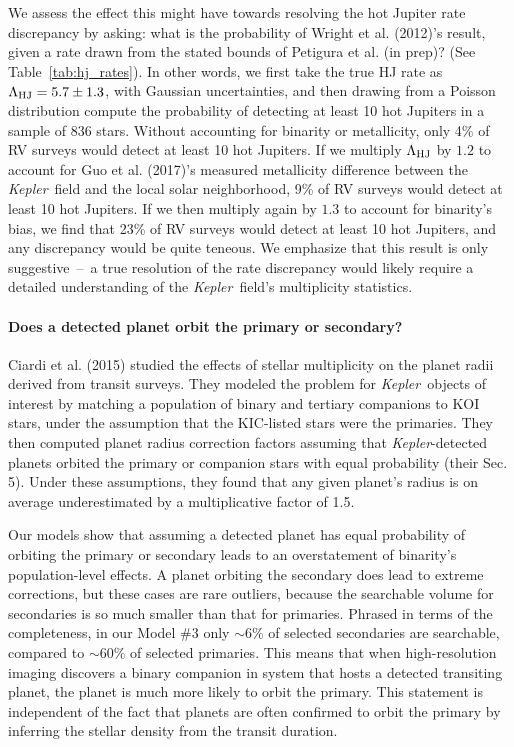We assess the effect this might have towards resolving the hot Jupiter rate 
discrepancy by asking:
what is the probability of Wright et al. (2012)'s result, given a rate drawn 
from the stated bounds of Petigura et al. (in prep)? (See 
Table~\ref{tab:hj_rates}).
In other words, we first take the true HJ rate as $\Lambda_{\rm HJ} = 5.7 \pm 
1.3$, with Gaussian uncertainties, and then drawing from a Poisson 
distribution compute the probability of detecting at least 10 hot Jupiters in 
a sample of 836 stars.
Without accounting for binarity or metallicity, only 4\% of RV surveys would 
detect at least 10 hot Jupiters.
If we multiply $\Lambda_{\rm HJ}$ by $1.2$ to account for Guo et al. 
(2017)'s measured metallicity difference between the {\it Kepler}\ field and 
the local solar neighborhood, 9\% of RV surveys would detect at least 10 hot 
Jupiters.
If we then multiply again by $1.3$ to account for binarity's bias, we find that
23\% of RV surveys would detect at least 10 hot Jupiters, and any discrepancy 
would be quite teneous.
We emphasize that this result is only suggestive~--~a true resolution of the 
rate discrepancy would likely require a detailed understanding of the {\it 
Kepler}\ field's multiplicity statistics.



\paragraph{Does a detected planet orbit the primary or secondary?}
Ciardi et al. (2015) studied the effects of stellar multiplicity on the 
planet radii derived from transit surveys.
They modeled the problem for {\it Kepler}\ objects of interest by matching a 
population of binary and tertiary companions to KOI stars, 
under the assumption that the KIC-listed stars were the primaries.
They then computed planet radius correction factors assuming that {\it 
Kepler}-detected planets orbited the primary or companion stars
with equal probability (their Sec. 5).
Under these assumptions, they found that any given planet's radius is on 
average underestimated by a multiplicative factor of 1.5.

Our models show that assuming a detected planet has equal probability of 
orbiting the primary or secondary leads to an overstatement of
binarity's population-level effects.
A planet orbiting the secondary does lead to extreme corrections, but these 
cases are rare outliers, because the searchable volume for secondaries is so 
much smaller than that for primaries.
Phrased in terms of the completeness, in our Model \#3 only $\sim 6\%$ of 
selected secondaries are searchable, compared to $\sim 60\%$ of selected 
primaries.
This means that when high-resolution imaging discovers a binary companion in 
system that hosts a detected transiting planet, the planet is much
more likely to orbit the primary.
This statement is independent of the fact that planets are often confirmed to 
orbit the primary by inferring the stellar density from the transit duration.


